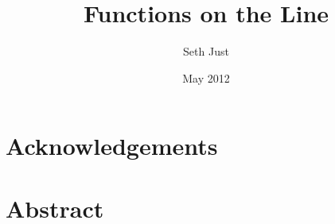 \documentclass{reedthesis}
\title{Functions on the Line}
\author{Seth Just}
\date{May 2012}
\begin{document}
  \maketitle
  \frontmatter
  \pagestyle{empty} %

  \chapter*{Acknowledgements}


  \tableofcontents

  \chapter*{Abstract}

  \mainmatter
  \pagestyle{fancyplain} %

  

  

  \appendix

  \backmatter

%   
   

  \singlespacing
  \raggedright

  
\end{document}
